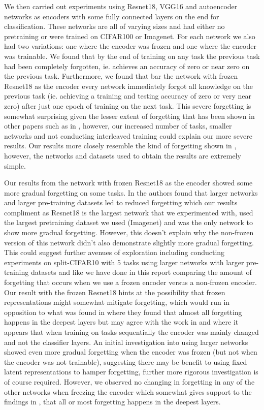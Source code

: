We then carried out experiments using Resnet18, VGG16 and autoencoder networks as encoders with some fully connected layers on the end for classification. These networks are all of varying sizes and had either no pretraining or were trained on CIFAR100 or Imagenet. For each network we also had two variations: one where the encoder was frozen and one where the encoder was trainable. We found that by the end of training on any task the previous task had been completely forgotten, ie. achieves an accuracy of zero or near zero on the previous task. Furthermore, we found that bar the network with frozen Resnet18 as the encoder every network immediately forgot all knowledge on the previous task (ie. achieving a training and testing accuracy of zero or very near zero) after just one epoch of training on the next task. This severe forgetting is somewhat surprising given the lesser extent of forgetting that has been shown in other papers such as in \cite{ramasesh2022effect,toneva2018empirical}, however, our increased number of tasks, smaller networks and not conducting interleaved training could explain our more severe results. Our results more closely resemble the kind of forgetting shown in \cite{mccloskey1989catastrophic}, however, the networks and datasets used to obtain the results are extremely simple. 

Our results from the network with frozen Resnet18 as the encoder showed some more gradual forgetting on some tasks. In \cite{ramasesh2022effect} the authors found that larger networks and larger pre-training datasets led to reduced forgetting which our results compliment as Resnet18 is the largest network that we experimented with, used the largest pretraining dataset we used (Imagenet) and was the only network to show more gradual forgetting. However, this doesn't explain why the non-frozen version of this network didn't also demonstrate slightly more gradual forgetting. This could suggest further avenues of exploration including conducting experiments on split-CIFAR10 with 5 tasks using larger networks with larger pre-training datasets and like we have done in this report comparing the amount of forgetting that occurs when we use a frozen encoder versus a non-frozen encoder. Our result with the frozen Resnet18 hints at the possibility that frozen representations might somewhat mitigate forgetting, which would run in opposition to what was found in \cite{ramasesh2020anatomy} where they found that almost all forgetting happens in the deepest layers but may agree with the work in \cite{rebuffi2017icarl} and \cite{li2017learning} where it appears that when training on tasks sequentially the encoder was mainly changed and not the classifier layers. An initial investigation into using larger networks showed even more gradual forgetting when the encoder was frozen (but not when the encoder was not trainable), suggesting there may be benefit to using fixed latent representations to hamper forgetting, further more rigorous investigation is of course required. However, we observed no changing in forgetting in any of the other networks when freezing the encoder which somewhat gives support to the findings in \cite{ramasesh2020anatomy}, that all or most forgetting happens in the deepest layers.

